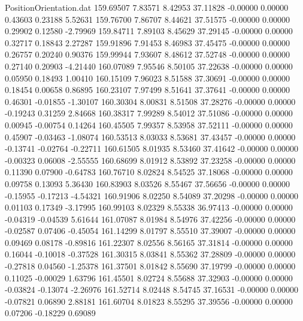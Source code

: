 \begin{filecontents}{PositionOrientation.dat}
 159.69507    7.83571    8.42953    37.11828   -0.00000    0.00000    0.43603    0.23188    5.52631
 159.76700    7.86707    8.44621    37.51575   -0.00000    0.00000    0.29902    0.12580   -2.79969
 159.84711    7.89103    8.45629    37.29145   -0.00000    0.00000    0.32717    0.18843    2.27287
 159.91896    7.91453    8.46983    37.45475   -0.00000    0.00000    0.26757    0.20240    0.90376
 159.99944    7.93607    8.48612    37.52748   -0.00000    0.00000    0.27140    0.20903   -4.21440
 160.07089    7.95546    8.50105    37.22638   -0.00000    0.00000    0.05950    0.18493    1.00410
 160.15109    7.96023    8.51588    37.30691   -0.00000    0.00000    0.18454    0.00658    0.86895
 160.23107    7.97499    8.51641    37.37641   -0.00000    0.00000    0.46301   -0.01855   -1.30107
 160.30304    8.00831    8.51508    37.28276   -0.00000    0.00000   -0.19243    0.31259    2.84668
 160.38317    7.99289    8.54012    37.51086   -0.00000    0.00000    0.00945   -0.00754    0.14264
 160.45505    7.99357    8.53958    37.52111   -0.00000    0.00000    0.45907   -0.03463   -1.08074
 160.53513    8.03033    8.53681    37.43457   -0.00000    0.00000   -0.13741   -0.02764   -0.22711
 160.61505    8.01935    8.53460    37.41642   -0.00000    0.00000   -0.00323    0.06008   -2.55555
 160.68699    8.01912    8.53892    37.23258   -0.00000    0.00000    0.11390    0.07900   -0.64783
 160.76710    8.02824    8.54525    37.18068   -0.00000    0.00000    0.09758    0.13093    5.36430
 160.83903    8.03526    8.55467    37.56656   -0.00000    0.00000   -0.15955   -0.17213   -4.54321
 160.91906    8.02250    8.54089    37.20298   -0.00000    0.00000    0.01103    0.17349   -3.17995
 160.99103    8.02329    8.55338    36.97413   -0.00000    0.00000   -0.04319   -0.04539    5.61644
 161.07087    8.01984    8.54976    37.42256   -0.00000    0.00000   -0.02587    0.07406   -0.45054
 161.14299    8.01797    8.55510    37.39007   -0.00000    0.00000    0.09469    0.08178   -0.89816
 161.22307    8.02556    8.56165    37.31814   -0.00000    0.00000    0.16044   -0.10018   -0.37528
 161.30315    8.03841    8.55362    37.28809   -0.00000    0.00000   -0.27818    0.04560   -1.25378
 161.37501    8.01842    8.55690    37.19799   -0.00000    0.00000    0.11025   -0.00029    1.63796
 161.45501    8.02724    8.55688    37.32903   -0.00000    0.00000   -0.03824   -0.13074   -2.26976
 161.52714    8.02448    8.54745    37.16531   -0.00000    0.00000   -0.07821    0.06890    2.88181
 161.60704    8.01823    8.55295    37.39556   -0.00000    0.00000    0.07206   -0.18229    0.69089

\end{filecontents}
